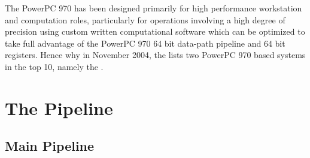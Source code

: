 \documentclass[a4paper,12pt]{article}
\begin{document}
The PowerPC 970 has been designed primarily for high performance
workstation and computation roles, particularly for operations involving
a high degree of precision using custom written computational software
which can be optimized to take full advantage of the PowerPC 970 64 bit
data-path pipeline and 64 bit registers. Hence why in November 2004, the
\cite[published list of high performance computing systems]{a11} lists
two PowerPC 970 based systems in the top 10, namely the \cite[Marenostrum
in the Barcelona Supercomputer Centre and the System X system in
Virginia Tech]{a11}.

\begin{figure}[hb]

\begin{center}


\end{center}

\caption{\cite[The IBM PowerPC 970 Microprocessor Design Layout]{a6}}

\end{figure}

\section{The Pipeline}

\subsection{Main Pipeline}
\end{document}
